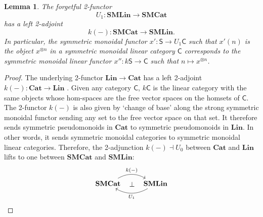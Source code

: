 \documentclass[12pt,reqno]{amsart}
\theoremstyle{plain}
\newtheorem{lem}[thm]{Lemma}
\theoremstyle{definition}
\theoremstyle{remark}
\newcommand{\maps}{\colon}
\newcommand{\category}[1]{\mathsf{#1}}
\newcommand{\C}{\category C}
\renewcommand{\S}{\category S}
\newcommand{\SMC}{\namedbicat{SMCat}}
\newcommand{\SMLin}{\namedbicat{SMLin}}
\newcommand{\namedbicat}[1]{\mathbf{#1}}
\newcommand{\CCat}{\namedbicat{Cat}}
\newcommand{\Lin}{\namedbicat{Lin}}
\numberwithin{thm}{section}
\begin{document}
\begin{lem}
\label{lem:U1}
    The forgetful 2-functor
    \[ 
        U_1 \maps \SMLin \to \SMC 
    \]
    has a left 2-adjoint
    \[ 
        k(-) \maps \SMC \to \SMLin. 
    \]
    In particular, the symmetric monoidal functor $x' \maps \S \to U_1\C$ such that $x'(n)$ is the object $x^{\otimes n}$ in a symmetric monoidal linear category $\C$ corresponds to the symmetric monoidal linear functor $x'' \maps k\S \to \C$ such that $n \mapsto x^{\otimes n}$.
\end{lem}
\begin{proof}
    The underlying 2-functor $\Lin \to \CCat$ has a left 2-adjoint $k(-) \maps \CCat \to \Lin$  \cite[Prop.\ 6.4.7]{BorceuxII}. Given any category $\C$, $k\C$ is the linear category with the same objects whose hom-spaces are the free vector spaces on the homsets of $\C$. The 2-functor $k(-)$ is also given by `change of base' along the strong symmetric monoidal functor sending any set to the free vector space on that set. It therefore sends symmetric pseudomonoids \cite{Monoidalbicatshopfalgebroids} in $\CCat$ to symmetric pseudomonoids in $\Lin$. In other words, it sends symmetric monoidal categories to symmetric monoidal linear categories. Therefore, the 2-adjunction $k(-) \dashv U_0$ between $\CCat$ and $\Lin$ lifts to one between $\SMC$ and $\SMLin$:  
    \[
    \begin{tikzcd}
        \SMC
        \arrow[r, bend left, "k(-)"]
        \arrow[r, phantom, "\bot"]
        &
        \SMLin
        \arrow[l, bend left, "U_1"]
    \end{tikzcd}
    \qedhere
    \]
\end{proof}
\end{document}
